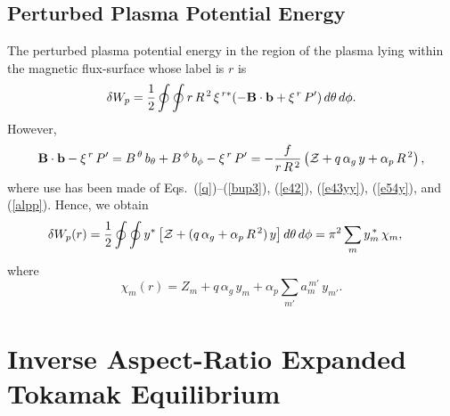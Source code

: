 \documentclass[12pt,prb,aps,notitlepage]{revtex4-1}
\begin{document}
\subsection{Perturbed Plasma Potential Energy}
The perturbed plasma potential energy in the region of the plasma lying within the magnetic flux-surface whose label is $r$ is 
\begin{equation}
\delta W_p = \frac{1}{2}\oint\oint r\,R^{\,2}\,\xi^{\,r\ast}(-{\bf B}\cdot{\bf b} + \xi^{\,r}\,P')\,d\theta\,d\phi.
\end{equation}
However,
\begin{equation}
{\bf B}\cdot{\bf b} -\xi^{\,r}\,P' = B^{\,\theta}\,b_\theta+B^{\,\phi}\,b_\phi - \xi^{\,r}\,P'
= - \frac{f}{r\,R^{\,2}}\left({\cal Z} + q\,\alpha_g\,y + \alpha_p\,R^{\,2}\right),
\end{equation}
where use has been made of Eqs.~(\ref{q})--(\ref{bup3}), (\ref{e42}), (\ref{e43yy}), (\ref{e54y}),  and (\ref{alpp}). Hence,
we obtain
\begin{align}\label{e87j}
\delta W_p(r) &=\frac{1}{2}\oint\oint y^{\ast}\left[{\cal Z} + (q\,\alpha_g + \alpha_p\,R^{\,2})\,y\right]d\theta\,d\phi= \pi^2\sum_{m}y_m^{\,\ast}\,\chi_m,
\end{align}
where 
\begin{equation}\label{chidef}
\chi_m(r)=Z_m + q\,\alpha_g\,y_m + \alpha_p\sum_{m'} a_m^{\,m'}\,y_{m'}.
\end{equation}

\section{Inverse Aspect-Ratio Expanded Tokamak Equilibrium}\label{large}
\end{document}
